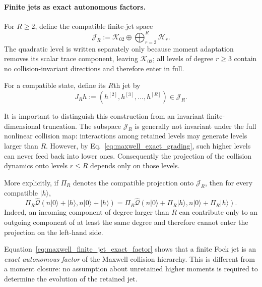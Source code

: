 \documentclass[11pt,oneside]{article}
\numberwithin{equation}{section}
\theoremstyle{definition}
\begin{document}
\paragraph{Finite jets as exact autonomous factors.}

For $R\geq2$, define the compatible finite-jet space
\begin{equation}
\mathscr J_R
:=
\mathscr K_{02}
\oplus
\bigoplus_{r=3}^{R}\mathscr H_r .
\label{eq:maxwell_finite_jet_space}
\end{equation}
The quadratic level is written separately only because moment adaptation
removes its scalar trace component, leaving $\mathscr K_{02}$; all levels
of degree $r\geq3$ contain no collision-invariant directions and therefore
enter in full.

For a compatible state, define its $R$th jet by
\begin{equation}
J_Rh
:=
\left(
h^{[2]},
h^{[3]},
\ldots,
h^{[R]}
\right)
\in\mathscr J_R.
\label{eq:maxwell_finite_jet_def}
\end{equation}

It is important to distinguish this construction from an invariant
finite-dimensional truncation.  The subspace $\mathscr J_R$ is generally
not invariant under the full nonlinear collision map: interactions among
retained levels may generate levels larger than $R$.  However, by
Eq.~\eqref{eq:maxwell_exact_grading}, such higher levels can never feed
back into lower ones.  Consequently the projection of the collision
dynamics onto levels $r\leq R$ depends only on those levels.

More explicitly, if $\Pi_R$ denotes the compatible projection onto
$\mathscr J_R$, then for every compatible $|h\rangle$,
\begin{equation}
\Pi_R
\widehat{\mathcal Q}
\left(
n|0\rangle+|h\rangle,
n|0\rangle+|h\rangle
\right)
=
\Pi_R
\widehat{\mathcal Q}
\left(
n|0\rangle+\Pi_R|h\rangle,
n|0\rangle+\Pi_R|h\rangle
\right).
\label{eq:maxwell_finite_jet_exact_factor}
\end{equation}
Indeed, an incoming component of degree larger than $R$ can contribute
only to an outgoing component of at least the same degree and therefore
cannot enter the projection on the left-hand side.

Equation~\eqref{eq:maxwell_finite_jet_exact_factor} shows that a finite
Fock jet is an \emph{exact autonomous factor} of the Maxwell collision
hierarchy.  This is different from a moment closure: no assumption about
unretained higher moments is required to determine the evolution of the
retained jet.
\end{document}
